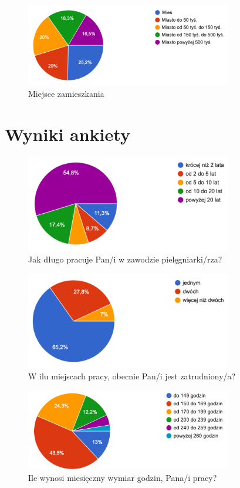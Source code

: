 \begin{figure}
\includegraphics[width=9cm]{char_gr_bad/zamieszka00}
\caption{Miejsce zamieszkania}
\end{figure}


\newpage


\section{Wyniki ankiety}

\begin{figure}
    \includegraphics[width=9cm]{wyniki/01_staz_pracy}
    \caption{Jak długo pracuje Pan/i w zawodzie pielęgniarki/rza?}
    \label{rys:staz}
\end{figure}

\begin{figure}
    \includegraphics[width=9cm]{wyniki/02_ile_miejsc}
    \caption{W ilu miejscach pracy, obecnie Pan/i jest zatrudniony/a?}
    \label{rys:etaty}
\end{figure}

\begin{figure}
    \includegraphics[width=9cm]{wyniki/03_wymiar_godzin}
    \caption{Ile wynosi miesięczny wymiar godzin, Pana/i pracy?}
    \label{rys:ile_godzin}
\end{figure}

